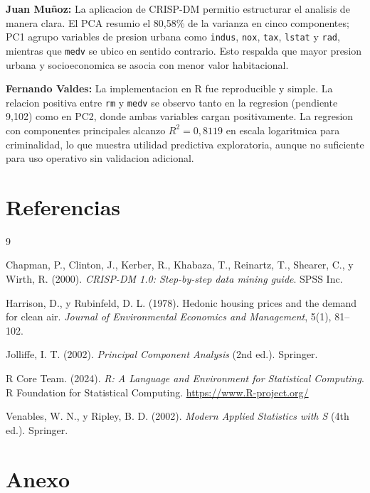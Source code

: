 \documentclass[10pt,a4paper]{article}
\begin{document}
\textbf{Juan Mu\~noz:} La aplicacion de CRISP-DM permitio estructurar el analisis de manera clara. El PCA resumio el 80,58\% de la varianza en cinco componentes; PC1 agrupo variables de presion urbana como \texttt{indus}, \texttt{nox}, \texttt{tax}, \texttt{lstat} y \texttt{rad}, mientras que \texttt{medv} se ubico en sentido contrario. Esto respalda que mayor presion urbana y socioeconomica se asocia con menor valor habitacional.

\textbf{Fernando Valdes:} La implementacion en R fue reproducible y simple. La relacion positiva entre \texttt{rm} y \texttt{medv} se observo tanto en la regresion (pendiente 9,102) como en PC2, donde ambas variables cargan positivamente. La regresion con componentes principales alcanzo $R^2 = 0,8119$ en escala logaritmica para criminalidad, lo que muestra utilidad predictiva exploratoria, aunque no suficiente para uso operativo sin validacion adicional.

\section{Referencias}
\small
\begin{thebibliography}{9}

Chapman, P., Clinton, J., Kerber, R., Khabaza, T., Reinartz, T., Shearer, C., y Wirth, R. (2000).
\textit{CRISP-DM 1.0: Step-by-step data mining guide}. SPSS Inc.

Harrison, D., y Rubinfeld, D. L. (1978).
Hedonic housing prices and the demand for clean air.
\textit{Journal of Environmental Economics and Management}, 5(1), 81--102.

Jolliffe, I. T. (2002).
\textit{Principal Component Analysis} (2nd ed.). Springer.

R Core Team. (2024).
\textit{R: A Language and Environment for Statistical Computing}. R Foundation for Statistical Computing.
\url{https://www.R-project.org/}

Venables, W. N., y Ripley, B. D. (2002).
\textit{Modern Applied Statistics with S} (4th ed.). Springer.

\end{thebibliography}

\newpage
\section*{Anexo}
\end{document}

